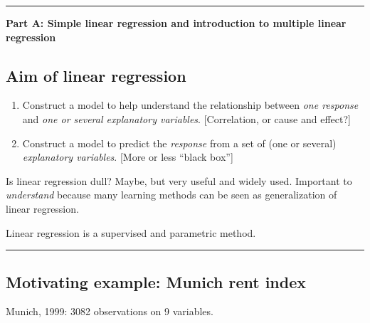 \documentclass[]{article}
\begin{document}
\begin{center}\rule{0.5\linewidth}{\linethickness}\end{center}

\large

\textbf{Part A: Simple linear regression and introduction to multiple
linear regression}

\normalsize

\hypertarget{aim-of-linear-regression}{%
\subsection{Aim of linear regression}\label{aim-of-linear-regression}}

\begin{enumerate}
\def\labelenumi{\arabic{enumi}.}
\item
  Construct a model to help understand the relationship between
  \emph{one response} and \emph{one or several explanatory variables}.
  {[}Correlation, or cause and effect?{]}
\item
  Construct a model to predict the \emph{response} from a set of (one or
  several) \emph{explanatory variables}. {[}More or less ``black
  box''{]}
\end{enumerate}

Is linear regression dull? Maybe, but very useful and widely used.
Important to \emph{understand} because many learning methods can be seen
as generalization of linear regression.

Linear regression is a supervised and parametric method.

\begin{center}\rule{0.5\linewidth}{\linethickness}\end{center}

\hypertarget{motivating-example-munich-rent-index}{%
\subsection{Motivating example: Munich rent
index}\label{motivating-example-munich-rent-index}}

Munich, 1999: 3082 observations on 9 variables.
\end{document}
